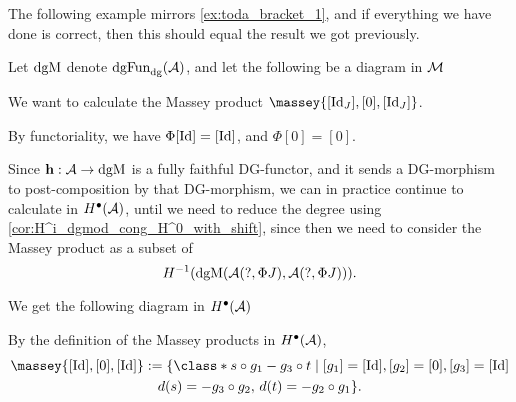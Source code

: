 The following example mirrors \autoref{ex:toda_bracket_1}, and if everything we have done is correct, then this should equal the result we got previously.

\begin{example}
    \label{ex:massey_product_1}
    Let \( \operatorname{dgM} \) denote \( \operatorname{dgFun}_{\operatorname{dg}}({\mathcal{A}}) \), and let the following be a diagram in \( {\mathcal{M}} \)
	\begin{center}
	\end{center}
	
	We want to calculate the Massey product \( \massey{[\Id_J], [0], [\Id_J]} \).

    By functoriality, we have \( \Phi [\operatorname{Id}] = [\operatorname{Id}] \), and \( \Phi [0] = [0] \).

    Since \( \mathbf{h}: {\mathcal{A}} \to \operatorname{dgM} \) is a fully faithful DG-functor, and it sends a DG-morphism to post-composition by that DG-morphism, we can in practice continue to calculate in \( H^{\bullet}({\mathcal{A}}) \), until we need to reduce the degree using \autoref{cor:H^i_dgmod_cong_H^0_with_shift}, since then we need to consider the Massey product as a subset of
    \[
        H^{-1}(\operatorname{dgM}({\mathcal{A}}(?, \Phi J), {\mathcal{A}}(?, \Phi J))).
    \]

    We get the following diagram in \( H^{\bullet}({\mathcal{A}}) \)
    \begin{center}
	\end{center}

    By the definition of the Massey products in \( H^\bullet({\mathcal{A}}) \),
    \begin{multline*}
        \massey{[\Id], [0], [\Id]} :=
        \{
            \class*{
                s \circ g_1 - g_3 \circ t
            }
            \mid [g_1] = [\Id], [g_2] = [0], [g_3] = [\Id] \\
            d(s) = - g_3 \circ g_2, \,
            d(t) = - g_2 \circ g_1
        \}.
    \end{multline*}


\end{example}
